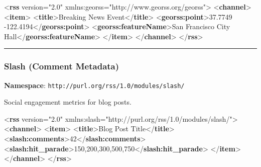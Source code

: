 \documentclass[
  letterpaper,
  DIV=11,
  numbers=noendperiod]{scrartcl}
\newenvironment{Shaded}{\begin{snugshade}}{\end{snugshade}}
\newcommand{\KeywordTok}[1]{\textcolor[rgb]{0.00,0.23,0.31}{\textbf{#1}}}
\newcommand{\NormalTok}[1]{\textcolor[rgb]{0.00,0.23,0.31}{#1}}
\newcommand{\OtherTok}[1]{\textcolor[rgb]{0.00,0.23,0.31}{#1}}
\newcommand{\StringTok}[1]{\textcolor[rgb]{0.13,0.47,0.30}{#1}}
\begin{document}
\begin{Shaded}
\begin{Highlighting}[]
\NormalTok{\textless{}}\KeywordTok{rss}\OtherTok{ version=}\StringTok{"2.0"} 
\OtherTok{     xmlns:georss=}\StringTok{"http://www.georss.org/georss"}\NormalTok{\textgreater{}}
\NormalTok{  \textless{}}\KeywordTok{channel}\NormalTok{\textgreater{}}
\NormalTok{    \textless{}}\KeywordTok{item}\NormalTok{\textgreater{}}
\NormalTok{      \textless{}}\KeywordTok{title}\NormalTok{\textgreater{}Breaking News Event\textless{}/}\KeywordTok{title}\NormalTok{\textgreater{}}
\NormalTok{      \textless{}}\KeywordTok{georss:point}\NormalTok{\textgreater{}37.7749 {-}122.4194\textless{}/}\KeywordTok{georss:point}\NormalTok{\textgreater{}}
\NormalTok{      \textless{}}\KeywordTok{georss:featureName}\NormalTok{\textgreater{}San Francisco City Hall\textless{}/}\KeywordTok{georss:featureName}\NormalTok{\textgreater{}}
\NormalTok{    \textless{}/}\KeywordTok{item}\NormalTok{\textgreater{}}
\NormalTok{  \textless{}/}\KeywordTok{channel}\NormalTok{\textgreater{}}
\NormalTok{\textless{}/}\KeywordTok{rss}\NormalTok{\textgreater{}}
\end{Highlighting}
\end{Shaded}

\begin{center}\rule{0.5\linewidth}{0.5pt}\end{center}

\subsubsection{Slash (Comment Metadata)}\label{slash-comment-metadata}

\textbf{Namespace}: \texttt{http://purl.org/rss/1.0/modules/slash/}

Social engagement metrics for blog posts.

\begin{Shaded}
\begin{Highlighting}[]
\NormalTok{\textless{}}\KeywordTok{rss}\OtherTok{ version=}\StringTok{"2.0"} 
\OtherTok{     xmlns:slash=}\StringTok{"http://purl.org/rss/1.0/modules/slash/"}\NormalTok{\textgreater{}}
\NormalTok{  \textless{}}\KeywordTok{channel}\NormalTok{\textgreater{}}
\NormalTok{    \textless{}}\KeywordTok{item}\NormalTok{\textgreater{}}
\NormalTok{      \textless{}}\KeywordTok{title}\NormalTok{\textgreater{}Blog Post Title\textless{}/}\KeywordTok{title}\NormalTok{\textgreater{}}
\NormalTok{    \textless{}}\KeywordTok{slash:comments}\NormalTok{\textgreater{}42\textless{}/}\KeywordTok{slash:comments}\NormalTok{\textgreater{}}
\NormalTok{      \textless{}}\KeywordTok{slash:hit\_parade}\NormalTok{\textgreater{}150,200,300,500,750\textless{}/}\KeywordTok{slash:hit\_parade}\NormalTok{\textgreater{}}
\NormalTok{    \textless{}/}\KeywordTok{item}\NormalTok{\textgreater{}}
\NormalTok{  \textless{}/}\KeywordTok{channel}\NormalTok{\textgreater{}}
\NormalTok{\textless{}/}\KeywordTok{rss}\NormalTok{\textgreater{}}
\end{Highlighting}
\end{Shaded}
\end{document}
